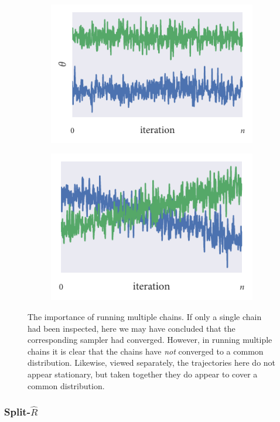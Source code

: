 \begin{figure}[bpt]
  \begin{subfigure}[b]{0.5\textwidth}
    \centering
    \includegraphics{B.pdf}
    \subcaption{}
    \label{fig:B}
  \end{subfigure}%
  \begin{subfigure}[b]{0.5\textwidth}
    \centering
    \includegraphics{W.pdf}
    \subcaption{}
    \label{fig:W}
  \end{subfigure}
  \caption{The importance of running multiple chains.  If only a
    single chain had been inspected, here we may have concluded that the
    corresponding sampler had converged. However, in running multiple chains
    it is clear that the chains have \emph{not} converged to a common
    distribution.  Likewise, viewed separately, the trajectories
    here do not appear stationary, but taken together they do appear to cover a
    common distribution.}
  \label{fig:convergence}
\end{figure}

\subsubsection{Split-$\widehat{R}$}

